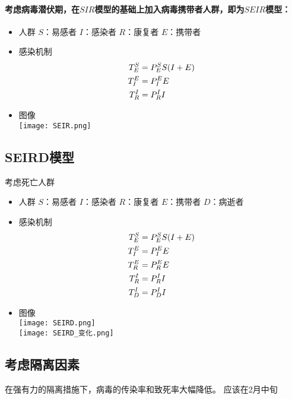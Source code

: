 \paragraph{考虑病毒潜伏期，在$SIR$模型的基础上加入病毒携带者人群，即为$SEIR$模型：}
\begin{itemize}
    \item 人群
          \subitem $S$：易感者
          \subitem $I$：感染者
          \subitem $R$：康复者
          \subitem $E$：携带者
    \item 感染机制
          \subitem
          \begin{align}
              T^{S}_{E}&=P^{S}_{E}S(I+E) \\
              T^{E}_{I}&=P^{E}_{I}E      \\
              T^{I}_{R}&=P^{I}_{R}I
          \end{align}
    \item 图像
          \\
          \texttt{[image: SEIR.png]}
\end{itemize}
\subsection{SEIRD模型}
考虑死亡人群
\begin{itemize}
    \item 人群
          \subitem $S$：易感者
          \subitem $I$：感染者
          \subitem $R$：康复者
          \subitem $E$：携带者
          \subitem $D$：病逝者
    \item 感染机制
          \subitem
          \begin{align}
              T^{S}_{E}&=P^{S}_{E}S(I+E) \\
              T^{E}_{I}&=P^{E}_{I}E      \\
              T^{E}_{R}&=P^{E}_{R}E      \\
              T^{I}_{R}&=P^{I}_{R}I      \\
              T^{I}_{D}&=P^{I}_{D}I
          \end{align}
    \item 图像
          \\
          \texttt{[image: SEIRD.png]}
          \\
          \texttt{[image: SEIRD\_变化.png]}
\end{itemize}
\subsection{考虑隔离因素}
\par
在强有力的隔离措施下，病毒的传染率和致死率大幅降低。
应该在2月中旬